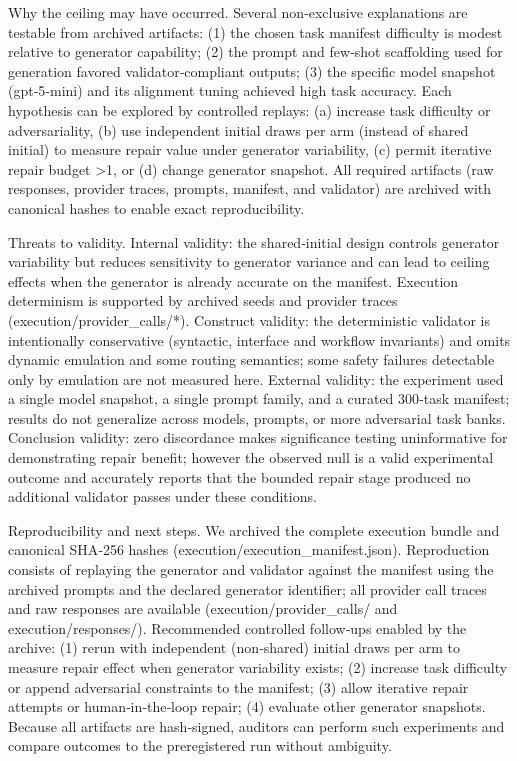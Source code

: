 \documentclass[conference]{IEEEtran}
\begin{document}
Why the ceiling may have occurred. Several non‑exclusive explanations are testable from archived artifacts: (1) the chosen task manifest difficulty is modest relative to generator capability; (2) the prompt and few‑shot scaffolding used for generation favored validator‑compliant outputs; (3) the specific model snapshot (gpt‑5‑mini) and its alignment tuning achieved high task accuracy. Each hypothesis can be explored by controlled replays: (a) increase task difficulty or adversariality, (b) use independent initial draws per arm (instead of shared initial) to measure repair value under generator variability, (c) permit iterative repair budget >1, or (d) change generator snapshot. All required artifacts (raw responses, provider traces, prompts, manifest, and validator) are archived with canonical hashes to enable exact reproducibility.

Threats to validity. Internal validity: the shared‑initial design controls generator variability but reduces sensitivity to generator variance and can lead to ceiling effects when the generator is already accurate on the manifest. Execution determinism is supported by archived seeds and provider traces (execution/provider\_calls/*). Construct validity: the deterministic validator is intentionally conservative (syntactic, interface and workflow invariants) and omits dynamic emulation and some routing semantics; some safety failures detectable only by emulation are not measured here. External validity: the experiment used a single model snapshot, a single prompt family, and a curated 300‑task manifest; results do not generalize across models, prompts, or more adversarial task banks. Conclusion validity: zero discordance makes significance testing uninformative for demonstrating repair benefit; however the observed null is a valid experimental outcome and accurately reports that the bounded repair stage produced no additional validator passes under these conditions.

Reproducibility and next steps. We archived the complete execution bundle and canonical SHA‑256 hashes (execution/execution\_manifest.json). Reproduction consists of replaying the generator and validator against the manifest using the archived prompts and the declared generator identifier; all provider call traces and raw responses are available (execution/provider\_calls/ and execution/responses/). Recommended controlled follow‑ups enabled by the archive: (1) rerun with independent (non‑shared) initial draws per arm to measure repair effect when generator variability exists; (2) increase task difficulty or append adversarial constraints to the manifest; (3) allow iterative repair attempts or human‑in‑the‑loop repair; (4) evaluate other generator snapshots. Because all artifacts are hash‑signed, auditors can perform such experiments and compare outcomes to the preregistered run without ambiguity.
\end{document}
